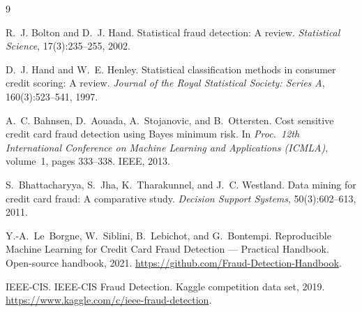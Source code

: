 \documentclass{article}
\begin{document}

\begin{thebibliography}{9}

R.~J. Bolton and D.~J. Hand.
Statistical fraud detection: A review.
\emph{Statistical Science}, 17(3):235--255, 2002.

D.~J. Hand and W.~E. Henley.
Statistical classification methods in consumer credit scoring: A review.
\emph{Journal of the Royal Statistical Society: Series A}, 160(3):523--541, 1997.

A.~C. Bahnsen, D.~Aouada, A.~Stojanovic, and B.~Ottersten.
Cost sensitive credit card fraud detection using Bayes minimum risk.
In \emph{Proc.~12th International Conference on Machine Learning and
Applications (ICMLA)}, volume~1, pages 333--338. IEEE, 2013.

S.~Bhattacharyya, S.~Jha, K.~Tharakunnel, and J.~C. Westland.
Data mining for credit card fraud: A comparative study.
\emph{Decision Support Systems}, 50(3):602--613, 2011.

Y.-A.~Le~Borgne, W.~Siblini, B.~Lebichot, and G.~Bontempi.
Reproducible Machine Learning for Credit Card Fraud Detection ---
Practical Handbook.
Open-source handbook, 2021. \url{https://github.com/Fraud-Detection-Handbook}.

IEEE-CIS.
IEEE-CIS Fraud Detection.
Kaggle competition data set, 2019.
\url{https://www.kaggle.com/c/ieee-fraud-detection}.

\end{thebibliography}
\end{document}
